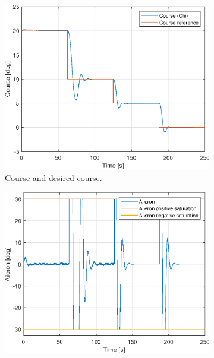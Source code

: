 \subsection{} %

\begin{figure}[ht]
	\centering
	\begin{subfigure}[b]{0.45\textwidth}
		\includegraphics[width=\textwidth]{figures/3g/chi_course.eps}
		\caption{Course and desired course. }
		\label{fig:3g_chi_course}
	\end{subfigure}
	\begin{subfigure}[b]{0.45\textwidth}
		\includegraphics[width=\textwidth]{figures/3g/delta_a_aileron.eps}

\end{subfigure}
\end{figure}
